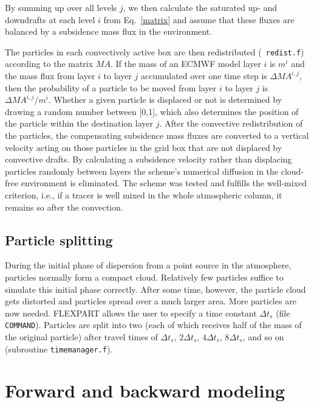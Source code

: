 \documentclass{egu}                  %
\begin{document}
By summing up over all levels $j$, we then calculate the saturated up- and
downdrafts at each level $i$ from Eq.~\ref{matrix} and assume that these fluxes
are balanced by a subsidence mass flux in the environment.

The particles in each convectively active box are then redistributed ({\tt
redist.f}) according to the matrix $MA$.  If the mass of an ECMWF model layer
$i$ is $m^i$ and the mass flux from layer $i$ to layer $j$ accumulated over one
time step is $\Delta MA^{i,j}$, then the probability of a particle to be moved
from layer $i$ to layer $j$ is $\Delta MA^{i,j}/m^i$.  Whether a given particle
is displaced or not is determined by drawing a random number between [0,1],
which also determines the position of the particle within the destination layer
$j$.  After the convective redistribution of the particles, the compensating
subsidence mass fluxes are converted to a vertical velocity acting on those
particles in the grid box that are not displaced by convective drafts.  By
calculating a subsidence velocity rather than displacing particles randomly
between layers the scheme's numerical diffusion in the cloud-free environment
is eliminated.  The scheme was tested and fulfills the well-mixed criterion,
i.e., if a tracer is well mixed in the whole atmospheric column, it remains so
after the convection.

\subsection{Particle splitting}

During the initial phase of dispersion from a point source in the atmosphere,
particles normally form a compact cloud.  Relatively few particles suffice to
simulate this initial phase correctly.  After some time, however, the particle
cloud gets distorted and particles spread over a much larger area.  More
particles are now needed.  FLEXPART allows the user to specify a time constant
$\Delta t_s$ (file \verb|COMMAND|).  Particles are split into two (each of
which receives half of the mass of the original particle) after travel times of
$\Delta t_s$, $2\Delta t_s$, $4\Delta t_s$, $8\Delta t_s$, and so on
(subroutine \verb|timemanager.f|).\par

\section{\label{backward}Forward and backward modeling}
\end{document}
